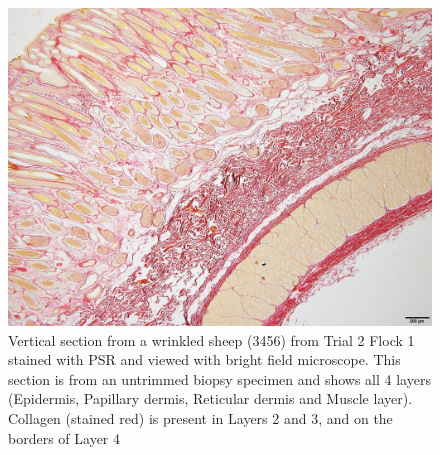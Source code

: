 %

\begin{figure}[!h]
  \centering
  \includegraphics[width=1.0\textwidth]{3456_4layers_4x_PSR.jpg}
  \caption{Vertical section from a wrinkled sheep (3456) from Trial 2 Flock 1 stained with PSR and viewed with bright field microscope. This section is from an untrimmed biopsy specimen and shows all 4 layers (Epidermis, Papillary dermis, Reticular dermis and Muscle layer). Collagen (stained red) is present in Layers 2 and 3, and on the borders of Layer 4}
  \label{fig:trial2psr}
\end{figure}

%

